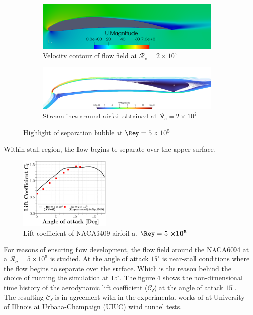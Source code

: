 \begin{figure}[ht!]
\centering
\begin{subfigure}{.45\textwidth}
\includegraphics[width=0.99\columnwidth]{Figures/VelocityContour.png}
\caption{Velocity contour of flow field at $\mathcal{R}_e=2\times10^5$}
\label{fig:velocitycontour}
\end{subfigure}
\begin{subfigure}{.45\textwidth}
\includegraphics[width=0.99\columnwidth]{figs/velocityContours2.png}
\caption{Streamlines around airfoil obtained at $\mathcal{R}_e=2\times10^5$}
\label{fig:streamlines}
\end{subfigure}
\caption{\label{fig:history} Highlight of separation bubble at $\Rey =5\times10^5$ }
\label{fig:history}
\end{figure}

%
Within stall region, the flow begins to separate over the upper surface. 

\begin{figure}[ht!]
\centering
\includegraphics[width=0.4\textwidth]{figs/liftCoeff.pdf}
\caption{Lift coefficient of NACA6409 airfoil at $\boldsymbol{\Rey$ = 5 $\times 10^5}$}
\label{fig:lfitCoe} 
\end{figure}

For reasons of ensuring flow development, the flow field around the NACA6094 at a $\mathcal{R_{\mathbf{e}}} = 5 \times 10 ^5$ is studied.
%
At the angle of attack $15^{\circ}$ is near-stall conditions where the flow begins to separate over the surface.
%
Which is the reason behind the choice of running the simulation at $15^{\circ}$.
%
The figure \ref{fig:lfitCoe} shows the non-dimensional time history of the aerodynamic lift coefficient ($\mathcal{C}_\mathscr{l}$) at the angle of attack $15^{\circ}$.
%
The resulting $\mathcal{C}_\mathscr{l}$ is in agreement with in the experimental works of \citet{Selig1995} at University of Illinois at Urbana-Champaign (UIUC) wind tunnel tests.


